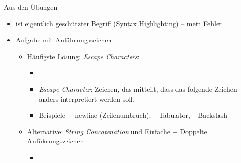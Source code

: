 
\begin{frame}[fragile]{Aus den Übungen}
%
\begin{itemize}
\item {} ist eigentlich geschützter Begriff (Syntax Highlighting) -- mein Fehler
\item Aufgabe mit Anführungszeichen
	\begin{itemize}
	\item Häufigste Lösung: \emph{Escape Characters}:
		\begin{itemize}
		\item {}
		\item \emph{Escape Character}: Zeichen, das mitteilt, dass das folgende Zeichen anders interpretiert werden soll.
		\item Beispiele:  -- newline (Zeilenumbruch);  -- Tabulator,  -- Backslash
		\end{itemize}
	\item Alternative: \emph{String Concatenation} und Einfache + Doppelte Anführungszeichen
		\begin{itemize}
		\item {}
		\end{itemize}
	\end{itemize}
\end{itemize}
%
\end{frame}


